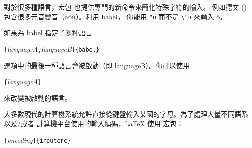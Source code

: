 對於很多種語言，宏包  也提供專門的新命令來簡化特殊字符的輸入。
例如德文 () 包含很多元音變音（\"a\"o\"u）。利用 \textsf{babel}，
你能用 \verb|"o| 而不是 \verb|\"o| 來輸入 \"o。

如果為 babel 指定了多種語言
\begin{lscommand}
\verb|[|\emph{languageA}\verb|,|\emph{languageB}\verb|]{babel}|
\end{lscommand}
\noindent 選項中的最後一種語言會被啟動（即 languageB）。你可以使用
\begin{lscommand}
\verb|{|\emph{languageA}\verb|}|
\end{lscommand}
\noindent 來改變被啟動的語言。


\newcommand{\ieih}[1]{%
\index{encodings!input!#1@\texttt{#1}}%
\index{input encodings!#1@\texttt{#1}}%
\index{#1@\texttt{#1}}}
\newcommand{\iei}[1]{%
\ieih{#1}\texttt{#1}}
\newcommand{\feih}[1]{%
\index{encodings!font!#1@\texttt{#1}}%
\index{font encodings!#1@\texttt{#1}}%
\index{#1@\texttt{#1}}}
\newcommand{\fei}[1]{%
\feih{#1}\texttt{#1}}

大多數現代的計算機系統允許直接從鍵盤輸入某國的字母。為了處理大量不同語系以及/或者
計算機平台使用的輸入編碼，\LaTeX{} 使用  宏包：
\begin{lscommand}
\verb|[|\emph{encoding}\verb|]{inputenc}|
\end{lscommand}


